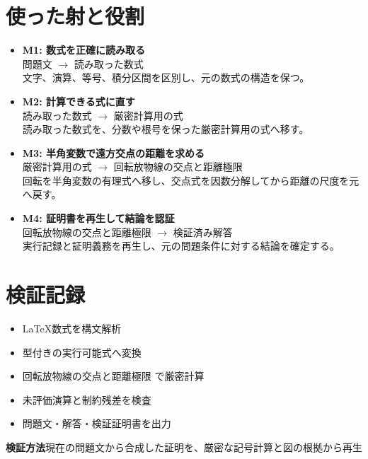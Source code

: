 \documentclass[uplatex,dvipdfmx,11pt]{jsarticle}
\begin{document}
\clearpage
\section*{使った射と役割}
\begin{itemize}
\item \textbf{M1: 数式を正確に読み取る}\\
問題文
$\longrightarrow$
読み取った数式\\
文字、演算、等号、積分区間を区別し、元の数式の構造を保つ。
\item \textbf{M2: 計算できる式に直す}\\
読み取った数式
$\longrightarrow$
厳密計算用の式\\
読み取った数式を、分数や根号を保った厳密計算用の式へ移す。
\item \textbf{M3: 半角変数で遠方交点の距離を求める}\\
厳密計算用の式
$\longrightarrow$
回転放物線の交点と距離極限\\
回転を半角変数の有理式へ移し、交点式を因数分解してから距離の尺度を元へ戻す。
\item \textbf{M4: 証明書を再生して結論を認証}\\
回転放物線の交点と距離極限
$\longrightarrow$
検証済み解答\\
実行記録と証明義務を再生し、元の問題条件に対する結論を確定する。
\end{itemize}




\section*{検証記録}
\begin{itemize}
\item LaTeX数式を構文解析
\item 型付きの実行可能式へ変換
\item 回転放物線の交点と距離極限 で厳密計算
\item 未評価演算と制約残差を検査
\item 問題文・解答・検証証明書を出力
\end{itemize}
\noindent\textbf{検証方法}\quad 現在の問題文から合成した証明を、厳密な記号計算と図の根拠から再生
\par{}
\end{document}
